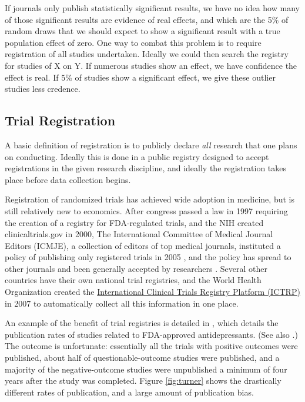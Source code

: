 \documentclass[12pt] {article}
\begin{document}
If journals only
publish statistically significant results, we have no idea how many of
those significant results are evidence of real effects, and which are
the 5\% of random draws that we should expect to show a significant
result with a true population effect of zero. One way to combat this problem is to
require registration of all studies undertaken. Ideally we could then search
the registry for studies of X on Y. If numerous studies show an
effect, we have confidence the effect is real. If 5\% of studies show a
significant effect, we give these outlier studies less credence.

\subsection{Trial Registration}\label{trial-registration}

A basic definition of registration is to publicly declare \emph{all}
research that one plans on conducting. Ideally this is done in a public
registry designed to accept registrations in the given research discipline,
and ideally the registration takes place before data collection begins.

Registration of randomized trials has achieved wide adoption in medicine, but is still
relatively new to economics. After congress passed a law in
1997 requiring the creation of a registry for FDA-regulated trials, and
the NIH created clinicaltrials.gov in 2000, The International Committee
of Medical Journal Editors (ICMJE), a collection of editors of top
medical journals, instituted a policy of publishing only registered
trials in 2005 \citep{DeAngelis2004}, and the policy has spread to
other journals and been generally accepted by researchers \citep{laine_clinical_2007}. Several other countries have their own national trial registries, and the World Health Organization created the \href{http://www.who.int/ictrp/about/en/}{International Clinical Trials Registry Platform (ICTRP)} in 2007 to automatically collect all this information in one place.

An example of the benefit of trial registries is detailed in
\cite{turner_selective_2008}, which details the publication rates of studies
related to FDA-approved antidepressants. (See also \cite{ioannidis_effectiveness_2008}.)
The outcome is unfortunate:
essentially all the trials with positive outcomes were published, about half of questionable-outcome studies were published, and a majority of the
negative-outcome studies were unpublished a minimum of four years after the
study was completed. Figure \ref{fig:turner} shows the drastically different
rates of publication, and a large amount of publication bias.
\end{document}
